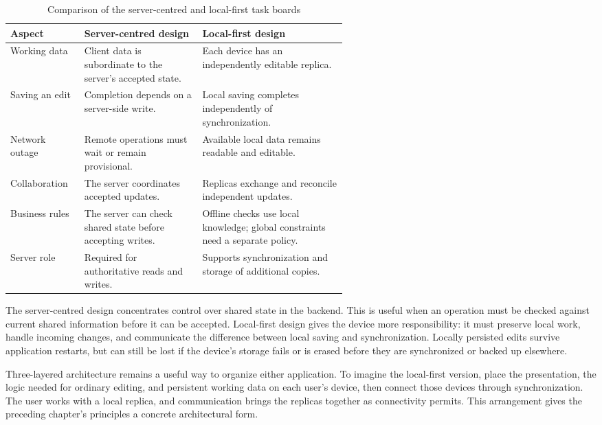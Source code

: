 \begin{table}[htbp]
	\centering
	\caption{Comparison of the server-centred and local-first task boards}
	\label{tab:server-centred-and-local-first}
	\small
	\begin{tabular}{@{}>{\raggedright\arraybackslash}p{0.22\linewidth}>{\raggedright\arraybackslash}p{0.35\linewidth}>{\raggedright\arraybackslash}p{}@{}}
		\toprule
		Aspect         & Server-centred design                                      & Local-first design                                                             \\
		\midrule
		Working data   & Client data is subordinate to the server's accepted state. & Each device has an independently editable replica.                             \\
		Saving an edit & Completion depends on a server-side write.                 & Local saving completes independently of synchronization.                       \\
		Network outage & Remote operations must wait or remain provisional.         & Available local data remains readable and editable.                            \\
		Collaboration  & The server coordinates accepted updates.                   & Replicas exchange and reconcile independent updates.                           \\
		Business rules & The server can check shared state before accepting writes. & Offline checks use local knowledge; global constraints need a separate policy. \\
		Server role    & Required for authoritative reads and writes.               & Supports synchronization and storage of additional copies.                     \\
		\bottomrule
	\end{tabular}
\end{table}

The server-centred design concentrates control over shared state in the backend.
This is useful when an operation must be checked against current shared information before it can be accepted.
Local-first design gives the device more responsibility: it must preserve local work, handle incoming changes, and communicate the difference between local saving and synchronization.
Locally persisted edits survive application restarts, but can still be lost if the device's storage fails or is erased before they are synchronized or backed up elsewhere.
\parencite{local-first-software}

Three-layered architecture remains a useful way to organize either application.
To imagine the local-first version, place the presentation, the logic needed for ordinary editing, and persistent working data on each user's device, then connect those devices through synchronization.
The user works with a local replica, and communication brings the replicas together as connectivity permits.
This arrangement gives the preceding chapter's principles a concrete architectural form.
